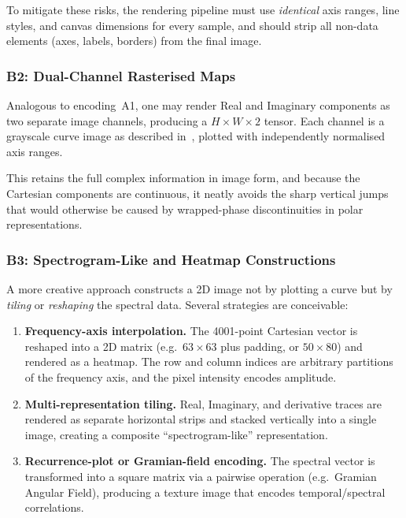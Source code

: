 \noindent
To mitigate these risks, the rendering pipeline must use
\emph{identical} axis ranges, line styles, and canvas dimensions for
every sample, and should strip all non-data elements (axes, labels,
borders) from the final image.

\subsubsection{B2: Dual-Channel Rasterised Maps}
\label{sec:repr:routeB:dualchannel}

Analogous to encoding~A1, one may render Real and Imaginary components as two
separate image channels, producing a $H \times W \times 2$ tensor.
Each channel is a grayscale curve image as described in~,
plotted with independently normalised axis ranges.

This retains the full complex information in image form, and because the Cartesian
components are continuous, it neatly avoids the sharp vertical jumps that would
otherwise be caused by wrapped-phase discontinuities in polar representations.

\subsubsection{B3: Spectrogram-Like and Heatmap Constructions}
\label{sec:repr:routeB:heatmap}

A more creative approach constructs a 2D image not by plotting a curve
but by \emph{tiling} or \emph{reshaping} the spectral data.  Several
strategies are conceivable:

\begin{enumerate}
    \item \textbf{Frequency-axis interpolation.}  The \num{4001}-point
        Cartesian vector is reshaped into a 2D matrix (e.g.\
        $63\times63$ plus padding, or $50\times80$) and rendered as a
        heatmap.  The row and column indices are arbitrary partitions of
        the frequency axis, and the pixel intensity encodes amplitude.
    \item \textbf{Multi-representation tiling.}  Real, Imaginary, and
        derivative traces are rendered as separate horizontal strips and
        stacked vertically into a single image, creating a composite
        ``spectrogram-like'' representation.
    \item \textbf{Recurrence-plot or Gramian-field encoding.}  The
        spectral vector is transformed into a square matrix via a
        pairwise operation (e.g.\ Gramian Angular Field), producing a
        texture image that encodes temporal/spectral correlations.
\end{enumerate}


